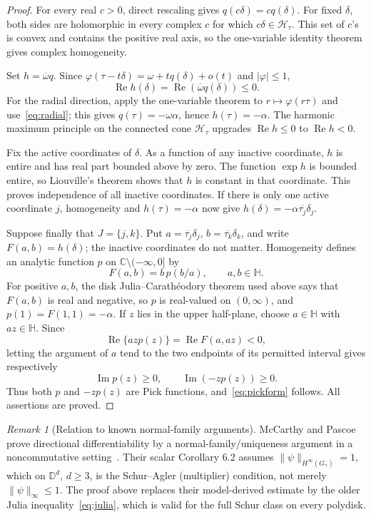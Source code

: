 \documentclass[11pt]{article}
\theoremstyle{definition}
\theoremstyle{remark}
\newtheorem{remark}[theorem]{Remark}
\newcommand{\D}{\mathbb D}
\newcommand{\C}{\mathbb C}
\newcommand{\re}{\operatorname{Re}}
\begin{document}
\begin{proof}
For every real \(c>0\), direct rescaling gives \(q(c\delta)=c q(\delta)\).  For fixed \(\delta\), both sides are holomorphic in every complex \(c\) for which \(c\delta\in\mathcal H_\tau\).  This set of \(c\)'s is convex and contains the positive real axis, so the one-variable identity theorem gives complex homogeneity.

Set \(h=\overline\omega q\).  Since
\(\varphi(\tau-t\delta)=\omega+tq(\delta)+o(t)\) and \(|\varphi|\le1\),
\[
 \re h(\delta)=\re(\overline\omega q(\delta))\le0.
\]
For the radial direction, apply the one-variable theorem to \(r\mapsto\varphi(r\tau)\) and use~\eqref{eq:radial}; this gives \(q(\tau)=-\omega\alpha\), hence \(h(\tau)=-\alpha\).  The harmonic maximum principle on the connected cone \(\mathcal H_\tau\) upgrades \(\re h\le0\) to \(\re h<0\).

Fix the active coordinates of \(\delta\).  As a function of any inactive coordinate, \(h\) is entire and has real part bounded above by zero.  The function \(\exp h\) is bounded entire, so Liouville's theorem shows that \(h\) is constant in that coordinate.  This proves independence of all inactive coordinates.  If there is only one active coordinate \(j\), homogeneity and \(h(\tau)=-\alpha\) now give \(h(\delta)=-\alpha\overline{\tau_j}\delta_j\).

Suppose finally that \(J=\{j,k\}\).  Put \(a=\overline{\tau_j}\delta_j\), \(b=\overline{\tau_k}\delta_k\), and write \(F(a,b)=h(\delta)\); the inactive coordinates do not matter.  Homogeneity defines an analytic function \(p\) on \(\C\setminus(-\infty,0]\) by
\[
 F(a,b)=b\,p(b/a),\qquad a,b\in\mathbb H.
\]
For positive \(a,b\), the disk Julia--Carath\'eodory theorem used above says that \(F(a,b)\) is real and negative, so \(p\) is real-valued on \((0,\infty)\), and \(p(1)=F(1,1)=-\alpha\).  If \(z\) lies in the upper half-plane, choose \(a\in\mathbb H\) with \(az\in\mathbb H\).  Since
\[
 \re\{azp(z)\}=\re F(a,az)<0,
\]
letting the argument of \(a\) tend to the two endpoints of its permitted interval gives respectively
\[
 \operatorname{Im}p(z)\ge0,
 \qquad \operatorname{Im}(-zp(z))\ge0.
\]
Thus both \(p\) and \(-zp(z)\) are Pick functions, and~\eqref{eq:pickform} follows.  All assertions are proved.
\end{proof}

\begin{remark}[Relation to known normal-family arguments]
McCarthy and Pascoe prove directional differentiability by a normal-family/uniqueness argument in a noncommutative setting~\cite{MP}.  Their scalar Corollary 6.2 assumes \(\|\psi\|_{H^\infty(G_\gamma)}=1\), which on \(\D^d\), \(d\ge3\), is the Schur--Agler (multiplier) condition, not merely \(\|\psi\|_\infty\le1\).  The proof above replaces their model-derived estimate by the older Julia inequality~\eqref{eq:julia}, which is valid for the full Schur class on every polydisk.
\end{remark}
\end{document}
